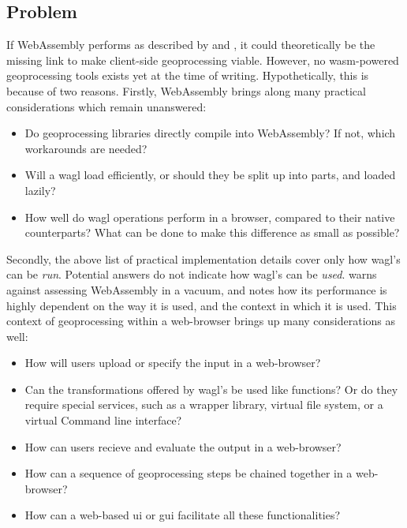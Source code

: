 


\newpage

\subsection{Problem}

If WebAssembly performs as described by \cite{haas_bringing_2017} and \cite{jangda_not_2019}, it could theoretically be the missing link to make client-side geoprocessing viable. However, no wasm-powered geoprocessing tools exists yet at the time of writing. Hypothetically, this is because of two reasons. Firstly, WebAssembly brings along many practical considerations which remain unanswered:

\begin{itemize}
  \item Do geoprocessing libraries directly compile into WebAssembly? If not, which workarounds are needed? 
  \item Will a \ac{wagl} load efficiently, or should they be split up into parts, and loaded lazily? 
  \item How well do \ac{wagl} operations perform in a browser, compared to their native counterparts? What can be done to make this difference as small as possible?
\end{itemize}

Secondly, the above list of practical implementation details cover only how \ac{wagl}'s can be \emph{run}. Potential answers do not indicate how \ac{wagl}'s can be \emph{used}. \cite{jangda_not_2019} warns against assessing WebAssembly in a vacuum, and notes how its performance is highly dependent on the way it is used, and the context in which it is used. This context of geoprocessing within a web-browser brings up many considerations as well: 

\begin{itemize}
  \item How will users upload or specify the input in a web-browser?
  \item Can the transformations offered by \ac{wagl}'s be used like functions? Or do they require special services, such as a wrapper library, virtual file system, or a virtual Command line interface? 
  \item How can users recieve and evaluate the output in a web-browser?
  \item How can a sequence of geoprocessing steps be chained together in a web-browser?
  \item How can a web-based \ac{ui} or \ac{gui} facilitate all these functionalities?
\end{itemize}

